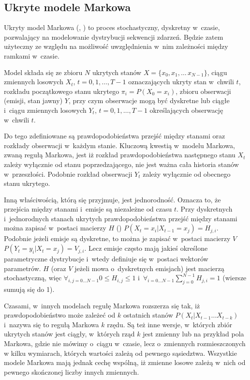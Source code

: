 \subsection{Ukryte modele Markowa}\label{sec:hmm}

Ukryty model Markowa (, ) to proces stochastyczny,
dyskretny w~czasie, pozwalający na modelowanie dystrybucji
sekwencji zdarzeń. Będzie zatem użyteczny ze względu na możliwość uwzględnienia w~nim zależności
między ramkami w~czasie.

Model składa się ze zbioru $N$ ukrytych stanów $X = \{x_0, x_1, \dots\, x_{N-1}\}$, ciągu zmiennych losowych
$X_t$, $t = 0, 1, \dots, T - 1$ oznaczających ukryty stan w~chwili $t$, rozkładu początkowego stanu ukrytego
$\pi_i = P(X_0 = x_i)$, zbioru obserwacji (emisji, stan jawny) $Y$, przy czym obserwacje mogą być dyskretne
lub ciągłe i~ciągu zmiennych losowych $Y_t$, $t = 0, 1, \dots, T - 1$ określających obserwację w~chwili $t$.

Do tego zdefiniowane są prawdopodobieństwa przejść między stanami oraz rozkłady obserwacji w~każdym stanie.
Kluczową kwestią w~modelu Markowa, zwaną regułą Markowa, jest iż rozkład prawdopodobieństwa następnego stanu $X_t$
zależy wyłącznie od stanu poprzedzającego, nie jest ważna cała historia stanów w~przeszłości. Podobnie rozkład
obserwacji $Y_t$ zależy wyłącznie od obecnego stanu ukrytego.

Inną właściwością, którą się przyjmuje, jest jednorodność. Oznacza to, że przejścia między stanami i~emisje są
niezależne od czasu $t$. Przy dyskretnych i~jednorodnych stanach ukrytych prawdopodobieństwa przejść
między stanami można zapisać w~postaci macierzy $H$ () $P(X_t = x_i | X_{t-1} = x_j) = H_{j, i}$.
Podobnie jeżeli emisje są dyskretne, to można je zapisać w~postaci macierzy $V$ $P(Y_t = y_i | X_t = x_j) = V_{j, i}$.
Lecz emisje często mają jakieś określone parametryczne dystrybucje i~wtedy definiuje się w~postaci wektorów parametrów.
$H$ (oraz $V$ jeżeli mowa o~dyskretnych emisjach) jest macierzą stochastyczną, więc $\forall_{i, j = 0 \dots N - 1} 0 \leq H_{i, j} \leq 1$ i~$\forall_{i = 0 \dots N - 1} \sum_{j = 0}^{N - 1} H_{j, i} = 1$ (wiersze sumują się do 1).

Czasami, w~innych modelach regułę Markowa rozszerza się tak, iż prawdopodobieństwo może zależeć od $k$ ostatnich stanów
$P(X_t | X_{t-1} \dots X_{t-k})$ i~nazywa się to regułą Markowa $k$ rzędu. Są też inne wersje, w~których zbiór
ukrytych stanów jest ciągły, w~których rząd $k$ jest zmienny lub na przykład pola Markowa,
gdzie nie mówimy o~ciągu w~czasie, lecz o~zmiennych rozmieszczonych
w kilku wymiarach, których wartości zależą od pewnego sąsiedztwa. Wszystkie modele Markowa mają jednak cechę wspólną, iż
zmienne losowe zależą w~nich od pewnego skończonej liczby innych zmiennych.


